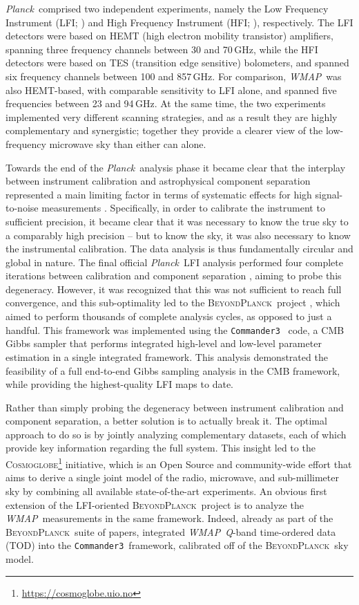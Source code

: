 \documentclass[twocolumn]{../../common/aa}
\def\WMAP{\emph{WMAP}}
\def\Planck{\emph{Planck}}
\def\commanderthree{\texttt{Commander3}}
\newcommand{\BP}{\textsc{BeyondPlanck}}
\newcommand{\cosmoglobe}{\textsc{Cosmoglobe}}
\newcommand{\Q}[0]{\textit Q}
\begin{document}
\Planck\ comprised two independent experiments, namely the Low Frequency Instrument (LFI; \citealp{planck2016-l02}) and High Frequency Instrument (HFI; \citealp{planck2016-l03}), respectively. The LFI detectors were based on HEMT (high electron mobility transistor) amplifiers, spanning three frequency channels between 30 and 70\,GHz, while the HFI detectors were based on TES (transition edge sensitive) bolometers, and spanned six frequency channels between 100 and 857\,GHz. For comparison, \WMAP\ was also HEMT-based, with comparable sensitivity to LFI alone, and spanned five frequencies between 23 and 94\,GHz. At the same time, the two experiments implemented very different scanning strategies, and as a result they are highly complementary and synergistic; together they provide a clearer view of the low-frequency microwave sky than either can alone.

Towards the end of the \Planck\ analysis phase it became clear that the interplay between instrument calibration and astrophysical component separation represented a main limiting factor in terms of systematic effects for high signal-to-noise measurements \citep{planck2016-l02}. Specifically, in order to calibrate the instrument to sufficient precision, it became clear that it was necessary to know the true sky to a comparably high precision -- but to know the sky, it was also necessary to know the instrumental calibration. The data analysis is thus fundamentally circular and global in nature. The final official \Planck\ LFI analysis performed four complete iterations between calibration and component separation \citep{planck2016-l02}, aiming to probe this degeneracy. However, it was recognized that this was not sufficient to reach full convergence, and this sub-optimality led to the \BP\ project \citep{bp01}, which aimed to perform thousands of complete analysis cycles, as opposed to just a handful. This framework was implemented using the \commanderthree\ \citep{bp03} code, a CMB Gibbs sampler that performs integrated high-level and low-level parameter estimation in a single integrated framework. This analysis demonstrated the feasibility of a full end-to-end Gibbs sampling analysis in the CMB framework, while providing the highest-quality LFI maps to date.

Rather than simply probing the degeneracy between instrument calibration and component separation, a better solution is to actually break it. The optimal approach to do so is by jointly analyzing complementary datasets, each of which provide key information regarding the full system. This insight led to the \cosmoglobe\footnote{\url{https://cosmoglobe.uio.no}} initiative, which is an Open Source and community-wide effort that aims to derive a single joint model of the radio, microwave, and sub-millimeter sky by combining all available state-of-the-art experiments. An obvious first extension of the LFI-oriented \BP\ project is to analyze the \WMAP\ measurements in the same framework. Indeed, already as part of the \BP\ suite of papers, \citet{bp17} integrated \WMAP\ \Q-band time-ordered data (TOD) into the \commanderthree\ framework, calibrated off of the \BP\ sky model.
\end{document}
